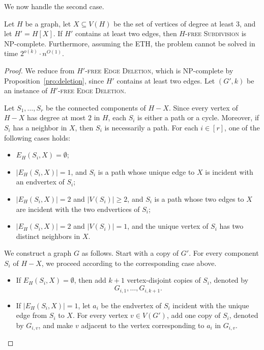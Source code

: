 \documentclass[a4paper,UKenglish,cleveref, autoref, thm-restate]{lipics-v2021}
\begin{document}
We now handle the second case.

\begin{lemma}
\label{lem:degree-3}
Let $H$ be a graph, let $X\subseteq V(H)$ be the set of vertices of degree at
least $3$, and let $H'=H[X]$.
If $H'$ contains at least two edges, then \textsc{$H$-free Subdivision} is
NP-complete.
Furthermore, assuming the ETH, the problem cannot be solved in time
$2^{o(k)}\cdot n^{O(1)}$.
\end{lemma}

\begin{proof}

We reduce from \textsc{$H'$-free Edge Deletion}, which is NP-complete by
Proposition~\ref{pro:deletion}, since $H'$ contains at least two edges.
Let $(G',k)$ be an instance of \textsc{$H'$-free Edge Deletion}.

Let $S_1,\ldots,S_r$ be the connected components of $H-X$.
Since every vertex of $H-X$ has degree at most $2$ in $H$, each $S_i$ is either
a path or a cycle.
Moreover, if $S_i$ has a neighbor in $X$, then $S_i$ is necessarily a path.
For each $i\in[r]$, one of the following cases holds:
\begin{itemize}
    \item $E_H(S_i,X)=\emptyset$;
    \item $|E_H(S_i,X)|=1$, and $S_i$ is a path whose unique edge to $X$ is
    incident with an endvertex of $S_i$;
    \item $|E_H(S_i,X)|=2$ and $|V(S_i)|\geq 2$, and $S_i$ is a path whose two
    edges to $X$ are incident with the two endvertices of $S_i$;
    \item $|E_H(S_i,X)|=2$ and $|V(S_i)|=1$, and the unique vertex of $S_i$ has
    two distinct neighbors in $X$.
\end{itemize}

We construct a graph $G$ as follows.
Start with a copy of $G'$.
For every component $S_i$ of $H-X$, we proceed according to the corresponding
case above.

\begin{itemize}
    \item If $E_H(S_i,X)=\emptyset$, then add $k+1$ vertex-disjoint copies of
    $S_i$, denoted by
    \[
        G_{i,1},\ldots,G_{i,k+1}.
    \]

    \item If $|E_H(S_i,X)|=1$, let $a_i$ be the endvertex of $S_i$ incident
    with the unique edge from $S_i$ to $X$.
    For every vertex $v\in V(G')$, add one copy of $S_i$, denoted by $G_{i,v}$,
    and make $v$ adjacent to the vertex corresponding to $a_i$ in $G_{i,v}$.


\end{itemize}
\end{proof}
\end{document}
